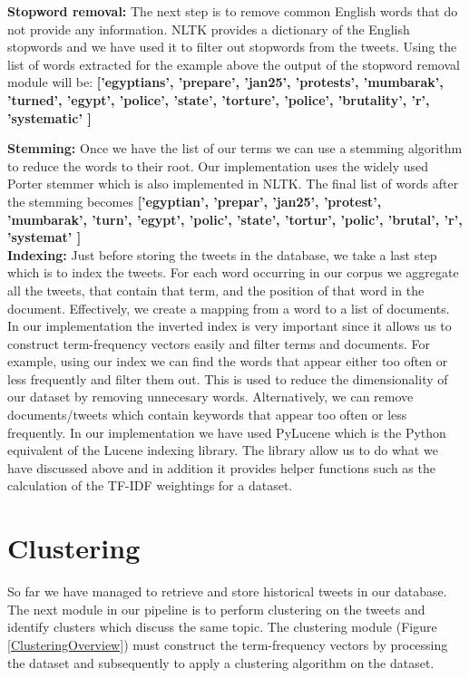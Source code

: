 \noindent \textbf{Stopword removal:} The next step is to remove common English words that do not provide any information. NLTK provides a dictionary of the English stopwords and we have used it to filter out stopwords from the tweets. Using the list of words extracted for the example above the output of the stopword removal module will be: \textbf{['egyptians', 'prepare', 'jan25', 'protests', 'mumbarak', 'turned', 'egypt', 'police', 'state', 'torture', 'police', 'brutality', 'r', 'systematic' ]}

\noindent \textbf{Stemming:} Once we have the list of our terms we can use a stemming algorithm to reduce the words to their root. Our implementation uses the widely used Porter stemmer which is also implemented in NLTK. The final list of words after the stemming becomes \textbf{['egyptian', 'prepar', 'jan25', 'protest', 'mumbarak', 'turn', 'egypt', 'polic', 'state', 'tortur', 'polic', 'brutal', 'r', 'systemat' ]}\\

\noindent \textbf{Indexing:} Just before storing the tweets in the database, we take a last step which is to index the tweets. For each word occurring in our corpus we aggregate all the tweets, that contain that term, and the position of that word in the document. Effectively, we create a mapping from a word to a list of documents. In our implementation the inverted index is very important since it allows us to construct term-frequency vectors easily and filter terms and documents. For example, using our index we can find the words that appear either too often or less frequently and filter them out. This is used to reduce the dimensionality of our dataset by removing unnecesary words. Alternatively, we
can remove documents/tweets which contain keywords that appear too often or less frequently. In our implementation we have used PyLucene which is the Python equivalent of the Lucene indexing library. The library allow us to do what we have discussed above and in addition it provides helper functions such as the calculation of the TF-IDF weightings for a dataset.
 
\section{Clustering}
So far we have managed to retrieve and store historical tweets in our database. The next module in our pipeline is to perform clustering on the tweets and identify clusters which discuss the same topic. The clustering module (Figure \ref{ClusteringOverview}) must construct the term-frequency vectors by processing the dataset and subsequently to apply a clustering algorithm on the dataset. 

